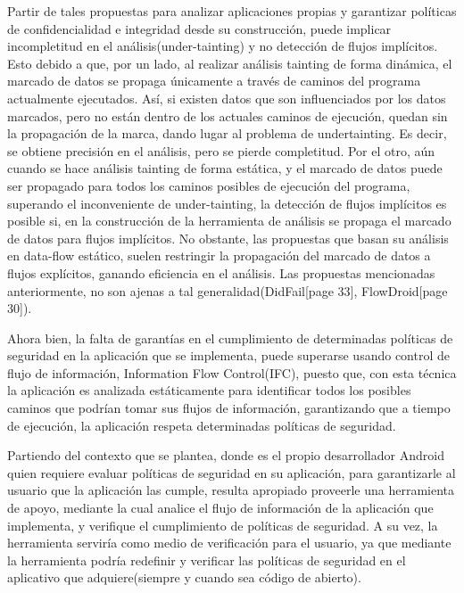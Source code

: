 Partir de tales propuestas para analizar aplicaciones propias y garantizar
políticas de confidencialidad e integridad desde su construcción, puede implicar
incompletitud en el análisis(under-tainting) y no detección de flujos
implícitos. Esto debido a que,
por un lado, al realizar análisis tainting de forma dinámica, el marcado de
datos se propaga únicamente a través de caminos del programa actualmente
ejecutados. Así, si existen datos que son influenciados por los datos marcados,
pero no están dentro de los actuales caminos de ejecución, quedan sin la
propagación de la marca, dando lugar al problema de
undertainting\cite{dynamic-tainting}\cite{Bit-Level-Taint-Analysis}. Es
decir, se obtiene precisión en el análisis, pero se pierde completitud.\newline
Por el otro, aún cuando se hace análisis tainting de forma estática, y el
marcado de datos puede ser propagado para todos los caminos posibles de
ejecución  del programa, superando el inconveniente de under-tainting, la
detección de flujos implícitos es posible si, en la construcción de la
herramienta de análisis se propaga el marcado de datos para flujos
implícitos\cite{taint-analysis}. 
No obstante, las propuestas que basan su análisis en data-flow estático,
suelen restringir la propagación del marcado de datos a flujos explícitos,
ganando eficiencia en el análisis. Las propuestas mencionadas anteriormente, no
son ajenas a tal generalidad(DidFail\cite{DidFail}[page 33],
FlowDroid\cite{FlowDroid-Thesis}[page 30]).

Ahora bien, la falta de garantías en el cumplimiento de determinadas
políticas de seguridad en la aplicación que se implementa, puede superarse
usando control de flujo de información, Information Flow Control(IFC), puesto
que, con esta técnica la aplicación  es analizada estáticamente  para
identificar todos los posibles caminos que podrían tomar sus flujos de
información, garantizando que a tiempo de ejecución, la aplicación respeta
determinadas políticas de seguridad.

Partiendo del contexto que se plantea, donde es el propio
desarrollador Android quien requiere evaluar políticas de seguridad en su
aplicación, para  garantizarle al usuario que la aplicación las cumple, resulta
apropiado proveerle una herramienta de apoyo, mediante la cual analice el flujo
de información de la aplicación que implementa, y verifique el cumplimiento
de políticas de seguridad.\newline
A su vez, la herramienta serviría como medio de verificación para el usuario, ya
que mediante la herramienta podría redefinir y verificar las políticas de
seguridad en el aplicativo que adquiere(siempre y cuando sea código de
abierto).\newline








